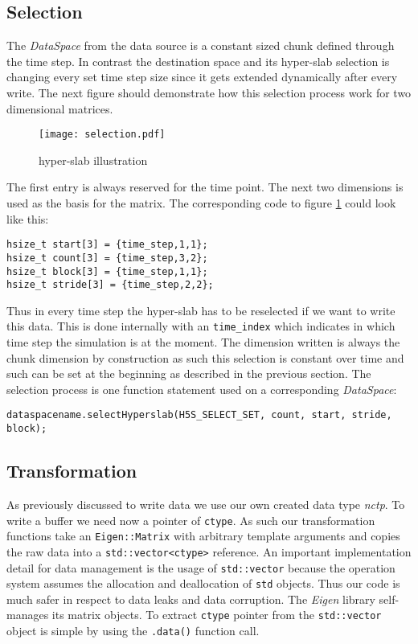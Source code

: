 \documentclass{article}
\begin{document}
\subsection{Selection}
The \textit{DataSpace} from the data source is a constant sized chunk defined through the time step. In contrast the destination space and its hyper-slab selection is changing every set time step size since it gets extended dynamically after every write. The next figure should demonstrate how this selection process work for two dimensional matrices.

\begin{figure}[ht!]
\centering
\texttt{[image: selection.pdf]}
\caption{hyper-slab illustration}
\label{fig:hyperslab}
\end{figure}
The first entry is always reserved for the time point. The next two dimensions is used as the basis for the matrix. The corresponding code to figure \ref{fig:hyperslab} could look like this:
\begin{lstlisting}
hsize_t start[3] = {time_step,1,1};
hsize_t count[3] = {time_step,3,2};
hsize_t block[3] = {time_step,1,1};
hsize_t stride[3] = {time_step,2,2};
\end{lstlisting}
Thus in every time step the hyper-slab has to be reselected if we want to write this data. This is done internally with an \texttt{time\_index} which indicates in which time step the simulation is at the moment. The dimension written is always the chunk dimension by construction as such this selection is constant over time and such can be set at the beginning as described in the previous section.
The selection process is one function statement used on a corresponding \textit{DataSpace}:
\begin{lstlisting}
dataspacename.selectHyperslab(H5S_SELECT_SET, count, start, stride, block);
\end{lstlisting}

\subsection{Transformation}
As previously discussed to write data we use our own created data type \textit{nctp}. To write a buffer we need now a pointer of \texttt{ctype}. As such our transformation functions take an \texttt{Eigen::Matrix} with arbitrary template arguments and copies the raw data into a \texttt{std::vector<ctype>} reference. An important implementation detail for data management is the usage of \texttt{std::vector} because the operation system assumes the allocation and deallocation of \texttt{std} objects. Thus our code is much safer in respect to data leaks and data corruption. The \textit{Eigen} library self-manages its matrix objects. To extract \texttt{ctype} pointer from the \texttt{std::vector} object is simple by using the \texttt{.data()} function call. 
\end{document}
